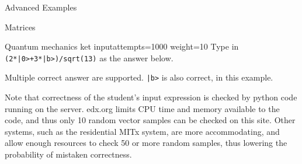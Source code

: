 \begin{edXchapter}{Advanced Examples}
\begin{edXsection}{Matrices}
\begin{edXvertical}
\begin{edXproblem}{Quantum mechanics ket input}{attempts=1000 weight=10}
Type in {\tt (2*|0>+3*|b>)/sqrt(13)} as the answer below.

Multiple correct answer are supported.  {\tt |b>} is also correct, in
this example.


\edXbr

%
%
%
%
% 
% 


%
%
%

\edXinline{$|\lambda\> = $ }
%

Note that correctness of the student's input expression is checked by
python code running on the server.  edx.org limits CPU time and memory
available to the code, and thus only 10 random vector samples can be
checked on this site.  Other systems, such as the residential MITx
system, are more accommodating, and allow enough resources to check 50
or more random samples, thus lowering the probability of mistaken
correctness.


\end{edXproblem}
\end{edXvertical}
\end{edXsection}
\end{edXchapter}
